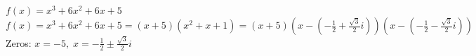 {$f(x) = x^{3} + 6x^{2} + 6x + 5$}
{$f(x) = x^{3} + 6x^{2} + 6x + 5 = (x + 5)(x^{2} + x + 1) = (x + 5) \left( x - \left( -\frac{1}{2} + \frac{\sqrt{3}}{2}i \right) \right) \left( x - \left(-\frac{1}{2} - \frac{\sqrt{3}}{2}i \right) \right)$ \\
Zeros: $x = -5, \;  x = -\frac{1}{2} \pm \frac{\sqrt{3}}{2}i $}

